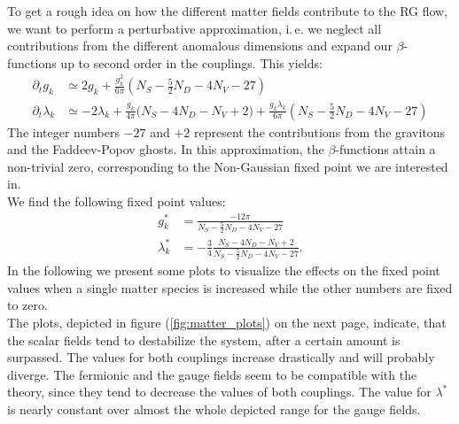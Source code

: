 To get a rough idea on how the different matter fields contribute to the RG flow, we want to perform a perturbative approximation, i.\,e. we neglect all contributions from the different anomalous dimensions and expand our $\beta$-functions up to second order in the couplings. This yields:
\begin{equation}
\begin{aligned}
	\partial_tg_k &\simeq 2g_k + \frac{g_k^2}{6\pi}\left(N_S - \frac{5}{2}N_D - 4N_V-27\right) \\[10pt]
	\partial_t\lambda_k &\simeq -2\lambda_k +\frac{g_k}{4\pi}\bigl(N_S-4N_D-N_V+2\bigr) + \frac{g_k\lambda_k}{6\pi}\left(N_S-\frac{5}{2}N_D - 4N_V  -27 \right)
\end{aligned}
\end{equation}
 The integer numbers $-27$ and $+2$ represent the contributions from the gravitons and the Faddeev-Popov ghosts. In this approximation, the $\beta$-functions attain a non-trivial zero, corresponding to the Non-Gaussian fixed point we are interested in. \\
 We find the following fixed point values:
 \begin{equation}
 	\begin{aligned}
 		g_k^{*} &= \frac{-12\pi}{N_S - \frac{5}{2}N_D - 4N_V-27} \\[10pt]
 		\lambda_k^{*} &= -\frac{3}{4}\frac{N_S - 4N_D-N_V+2}{N_S - \frac{5}{2}N_D-4N_V-27}.
 	\end{aligned}
 \end{equation}
 In the following we present some plots to visualize the effects on the fixed point values when a single matter species is increased while the other numbers are fixed to zero. \\
The plots, depicted in figure (\ref{fig:matter_plots}) on the next page, indicate, that the scalar fields tend to destabilize the system, after a certain amount is surpassed. The values for both couplings increase drastically and will probably diverge. The fermionic and the gauge fields seem to be compatible with the theory, since they tend to decrease the values of both couplings. The value for $\lambda^{*}$ is nearly constant over almost the whole depicted range for the gauge fields.   

